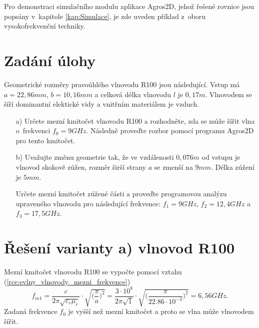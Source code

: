 
Pro demonstraci simulačního modulu aplikace Agros2D, jehož řešené rovnice jsou popsány v~kapitole \ref{kap:Simulace}, je zde uveden příklad z~oboru vysokofrekvenční techniky. 

\section{Zadání úlohy}
Geometrické rozměry pravoúhlého vlnovodu R100 \cite{R100} jsou následující. Vstup má $a = 22,86 \unit{mm}$, $b = 10,16 \unit{mm}$ a celková délka vlnovodu $l$ je $0,17 \unit{m}$. Vlnovodem se šíří dominantní elektické vidy a vnitřním materiálem je vzduch. 
\begin{enumerate}
\item[a)] Určete mezní kmitočet vlnovodu R100 a rozhodněte, zda se může šířit vlna o~frekvenci $f_0 = 9 \unit{GHz}$. Následně proveďte rozbor pomocí programu Agros2D pro tento kmitočet. 
\item[b)] Uvažujte změnu geometrie tak, že ve vzdálenosti $0,076 \unit{m}$ od vstupu je vlnovod skokově zúžen, rozměr širší strany $a$ se zmenší na $9 \unit {mm}$. Délka zúžení je $5 \unit{mm}$. 

Určete mezní kmitočet zúžené části a proveďte programovou analýzu upraveného vlnovodu pro následující frekvence:  $f_1 = 9 \unit{GHz}$, $f_2 = 12,4 \unit{GHz}$ a $f_3 = 17,5 \unit{GHz}$.
\end{enumerate}

\section{Řešení varianty a) vlnovod R100}
Mezní kmitočet vlnovodu R100 se vypočte pomocí vztahu (\ref{rce:evlny_vlnovody_mezni_frekvence})
\begin{displaymath}
f_{m1} = \frac{c}{2\pi\sqrt{\varepsilon_{r}\mu_{r}}}\cdot\sqrt{\bigg(\frac{\pi}{a}\bigg)^{2}} = \frac{3\cdot 10^{8}}{2\pi\sqrt{1}}\cdot\sqrt{\bigg(\frac{\pi}{22.86\cdot 10^{-3}}\bigg)^{2}} = 6,56 \unit{GHz}.
\end{displaymath}
Zadaná frekvence $f_0$ je vyšší než mezní kmitočet a proto se vlna může vlnovodem šířit.

